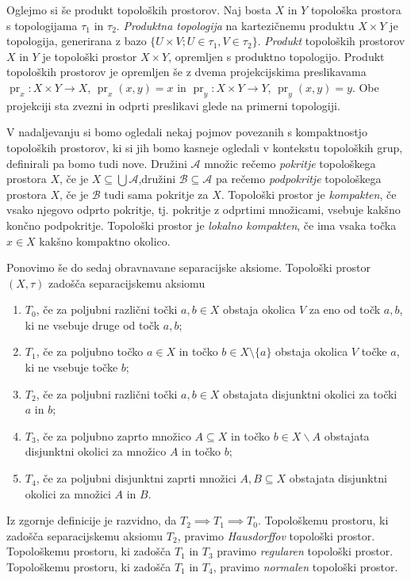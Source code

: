 \documentclass[mat1]{fmfdelo}
\DeclareMathOperator{\pr}{pr}
\begin{document}
Oglejmo si še produkt topoloških prostorov.
Naj bosta $X$ in $Y$ topološka prostora s topologijama $\tau_1$ in $\tau_2$. \emph{Produktna topologija} na kartezičnemu produktu $X \times Y$ je topologija, generirana z bazo $\lbrace U \times V ; U \in \tau_1, V \in \tau_2 \rbrace$. \emph{Produkt} topoloških prostorov $X$ in $Y$ je topološki prostor $X \times Y$, opremljen s produktno topologijo. Produkt topoloških prostorov je opremljen še z dvema projekcijskima preslikavama $\pr_x\colon X \times Y \to X$, $\pr_x(x, y) = x$ in $\pr_y\colon X \times Y \to Y$, $\pr_y(x, y) = y$. Obe projekciji sta zvezni in odprti preslikavi glede na primerni topologiji.

V nadaljevanju si bomo ogledali nekaj pojmov povezanih s kompaktnostjo to\-po\-loš\-kih prostorov, ki si jih bomo kasneje ogledali v kontekstu topoloških grup, definirali pa bomo tudi nove.
Družini $\mathcal{A}$ množic rečemo \emph{pokritje} topološkega prostora $X$, če je $X \subseteq \bigcup \mathcal{A}$,družini $\mathcal{B} \subseteq \mathcal{A}$ pa rečemo \emph{podpokritje} topološkega prostora $X$, če je $\mathcal{B}$ tudi sama pokritje za $X$.
Topološki prostor je \emph{kompakten}, če vsako njegovo odprto pokritje, tj. pokritje z odprtimi množicami, vsebuje kakšno končno podpokritje.
Topološki prostor je \emph{lokalno kompakten}, če ima vsaka točka $x \in X$ kakšno kompaktno okolico.

Ponovimo še do sedaj obravnavane separacijske aksiome.
Topološki prostor $(X, \tau)$ zadošča separacijskemu aksiomu
\begin{enumerate}
\item $T_0$, če za poljubni različni točki $a, b \in X$ obstaja okolica $V$ za eno od točk $a, b$, ki ne vsebuje druge od točk $a, b$;
\item $T_1$, če za poljubno točko $a \in X$ in točko $b \in X\setminus\lbrace a \rbrace$ obstaja okolica $V$ točke $a$, ki ne vsebuje točke $b$;
\item $T_2$, če za poljubni različni točki $a, b \in X$ obstajata disjunktni okolici za točki $a$ in $b$;
\item $T_3$, če za poljubno zaprto množico $A \subseteq X$ in točko $b \in X\backslash A$ obstajata disjunktni okolici za množico $A$ in točko $b$;
\item $T_4$, če za poljubni disjunktni zaprti množici $A, B \subseteq X$ obstajata disjunktni okolici za množici $A$ in $B$.
\end{enumerate}

Iz zgornje definicije je razvidno, da $T_2 \implies T_1 \implies T_0$.
Topološkemu prostoru, ki zadošča separacijskemu aksiomu $T_2$, pravimo \emph{Hausdorffov} topološki prostor.
Topološkemu prostoru, ki zadošča $T_1$ in $T_3$ pravimo \emph{regularen} topološki prostor.
Topološkemu prostoru, ki zadošča $T_1$ in $T_4$, pravimo \emph{normalen} topološki prostor.
\end{document}
